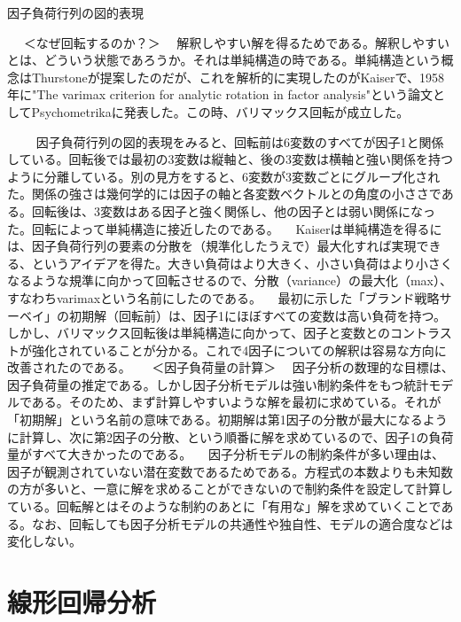 \documentclass[a4j,11pt,mc, twocolumn]{jreport}
\begin{document}
	因子負荷行列の図的表現
	　

	　
	＜なぜ回転するのか？＞
	　解釈しやすい解を得るためである。解釈しやすいとは、どういう状態であろうか。それは単純構造の時である。単純構造という概念はThurstoneが提案したのだが、これを解析的に実現したのがKaiserで、1958年に"The varimax criterion for analytic rotation in factor analysis"という論文としてPsychometrikaに発表した。この時、バリマックス回転が成立した。
	　

	　
	　因子負荷行列の図的表現をみると、回転前は6変数のすべてが因子1と関係している。回転後では最初の3変数は縦軸と、後の3変数は横軸と強い関係を持つように分離している。別の見方をすると、6変数が3変数ごとにグループ化された。関係の強さは幾何学的には因子の軸と各変数ベクトルとの角度の小ささである。回転後は、3変数はある因子と強く関係し、他の因子とは弱い関係になった。回転によって単純構造に接近したのである。
	　Kaiserは単純構造を得るには、因子負荷行列の要素の分散を（規準化したうえで）最大化すれば実現できる、というアイデアを得た。大きい負荷はより大きく、小さい負荷はより小さくなるような規準に向かって回転させるので、分散（variance）の最大化（max）、すなわちvarimaxという名前にしたのである。
	　最初に示した「ブランド戦略サーベイ」の初期解（回転前）は、因子1にほぼすべての変数は高い負荷を持つ。しかし、バリマックス回転後は単純構造に向かって、因子と変数とのコントラストが強化されていることが分かる。これで4因子についての解釈は容易な方向に改善されたのである。
	 　
	＜因子負荷量の計算＞
	　因子分析の数理的な目標は、因子負荷量の推定である。しかし因子分析モデルは強い制約条件をもつ統計モデルである。そのため、まず計算しやすいような解を最初に求めている。それが「初期解」という名前の意味である。初期解は第1因子の分散が最大になるように計算し、次に第2因子の分散、という順番に解を求めているので、因子1の負荷量がすべて大きかったのである。
	　因子分析モデルの制約条件が多い理由は、因子が観測されていない潜在変数であるためである。方程式の本数よりも未知数の方が多いと、一意に解を求めることができないので制約条件を設定して計算している。回転解とはそのような制約のあとに「有用な」解を求めていくことである。なお、回転しても因子分析モデルの共通性や独自性、モデルの適合度などは変化しない。




	\section{線形回帰分析}
\end{document}
